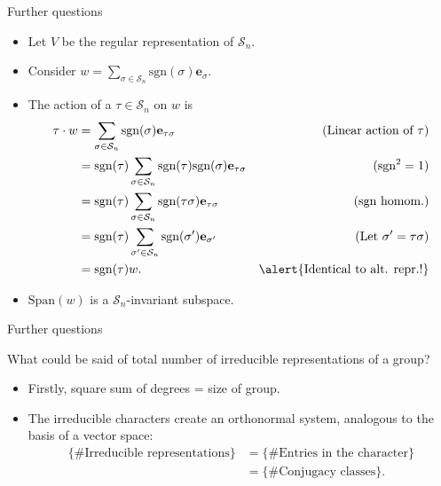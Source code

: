 \documentclass[10pt]{beamer}
\newcommand{\Sym}{\mathcal{S}}
\newcommand{\sgn}{\text{sgn}}
\newcommand{\bas}{\mathbf{e}}
\newcommand{\Span}{\text{Span}}
\begin{document}
\begin{frame}{Further questions}
	\begin{example}
		\begin{itemize}
			\item Let $V$ be the regular representation of $\Sym_n$.
			
			\item Consider $w = \sum_{\sigma \in \Sym_n} \sgn(\sigma)\bas_\sigma$.
			
			\item The action of a $\tau \in \Sym_n$ on $w$ is \begin{align*}
				\tau \cdot w &= \sum_{\sigma \in \Sym_n} \sgn(\sigma)\bas_{\tau\sigma} & \text{(Linear action of $\tau$)} \\ 
				&= \sgn(\tau)\sum_{\sigma \in \Sym_n} \sgn(\tau)\sgn(\sigma)\bas_{\tau\sigma} & \text{($\sgn^2 = 1$)}\\
				&= \sgn(\tau)\sum_{\sigma \in \Sym_n} \sgn(\tau\sigma)\bas_{\tau\sigma} & \text{(sgn homom.)} \\
				&= \sgn(\tau)\sum_{\sigma' \in \Sym_n} \sgn(\sigma')\bas_{\sigma'} & \text{(Let $\sigma' = \tau\sigma$)} \\
				&= \sgn(\tau) w. & \text{\alert{Identical to alt. repr.!}}
			\end{align*}	
			
			
			\item $\Span(w)$ is a $\Sym_n$-invariant subspace.
		\end{itemize}
		\end{example}
\end{frame}

\begin{frame}{Further questions}
	\begin{block}{What could be said of total number of irreducible representations of a group?}
		\begin{itemize}
			\item Firstly, square sum of degrees = size of group.
			
			\item The irreducible characters create an orthonormal system, analogous to the basis of a vector space:
			\begin{align*}
									\{\text{\# Irreducible representations}\} &= \{\text{\# Entries in the character}\} \\
									&= \{\text{\# Conjugacy classes}\}.
			\end{align*}
			
		\end{itemize}
	\end{block}
\end{frame}
\end{document}
